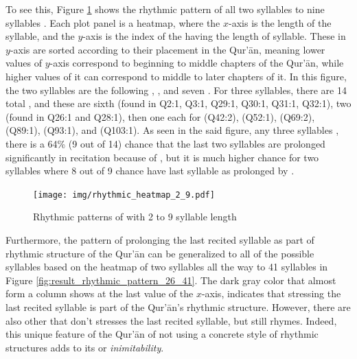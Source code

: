 To see this, Figure \ref{fig:result_rhythmic_pattern_2_9} shows the rhythmic pattern of all two syllables   to nine syllables  . Each plot panel is a heatmap, where the $x$-axis is the length of the syllable, and the $y$-axis is the index of the   having the length of syllable. These   in $y$-axis are sorted according to their placement in the Qur'\=an, meaning lower values of $y$-axis correspond to beginning to middle chapters of the Qur'\=an, while higher values of it can correspond to middle to later chapters of it. In this figure, the two syllables are the following  ,  \;, and seven  . For three syllables, there are 14 total  , and these are sixth   (found in Q2:1, Q3:1, Q29:1, Q30:1, Q31:1, Q32:1), two \; (found in Q26:1 and Q28:1), then one each for   (Q42:2),   (Q52:1),   (Q69:2),   (Q89:1),   (Q93:1), and   (Q103:1). As seen in the said figure, any three syllables  , there is a 64\% (9 out of 14) chance that the last two syllables are prolonged significantly in recitation because of  , but it is much higher chance for two syllables where 8 out of 9 chance have last syllable as prolonged by  .

\begin{figure}[!t]
    \centering
    \texttt{[image: img/rhythmic\_heatmap\_2\_9.pdf]}
    \caption{Rhythmic patterns of   with 2 to 9 syllable length}
    \label{fig:result_rhythmic_pattern_2_9}
\end{figure}

Furthermore, the pattern of prolonging the last recited syllable as part of rhythmic structure of the Qur'\=an can be generalized to all of the possible syllables based on the heatmap of two syllables all the way to 41 syllables in Figure \ref{fig:result_rhythmic_pattern_26_41}. The dark gray color that almost form a column shows at the last value of the $x$-axis, indicates that stressing the last recited syllable is part of the Qur'\=an's rhythmic structure. However, there are also other   that don't stresses the last recited syllable, but still rhymes. Indeed, this unique feature of the Qur'\=an of not using a concrete style of rhythmic structures adds to its   or \textit{inimitability}.


